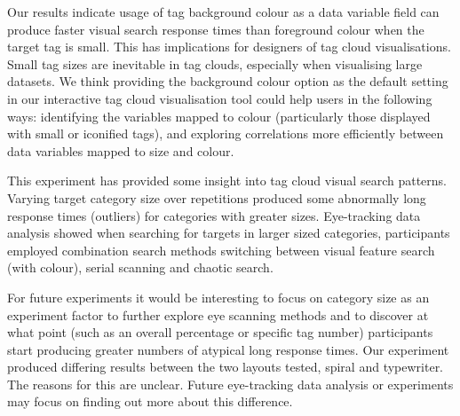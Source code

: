 Our results indicate usage of tag background colour as a data variable field can produce faster visual search response times than foreground colour when the target tag is small. This has implications for designers of tag cloud visualisations. Small tag sizes are inevitable in tag clouds, especially when visualising large datasets. We think providing the background colour option as the default setting in our interactive tag cloud visualisation tool could help users in the following ways: identifying the variables mapped to colour (particularly those displayed with small or iconified tags), and exploring correlations more efficiently between data variables mapped to size and colour. 

This experiment has provided some insight into tag cloud visual search patterns. Varying target category size over repetitions produced some abnormally long response times (outliers) for categories with greater sizes. Eye-tracking data analysis showed when searching for targets in larger sized categories, participants employed combination search methods switching between visual feature search (with colour), serial scanning and chaotic search. 

For future experiments it would be interesting to focus on category size as an experiment factor to further explore eye scanning methods and to discover at what point (such as an overall percentage or specific tag number) participants start producing greater numbers of atypical long response times. Our experiment produced differing results between the two layouts tested, spiral and typewriter. The reasons for this are unclear. Future eye-tracking data analysis or experiments may focus on finding out more about this difference.




